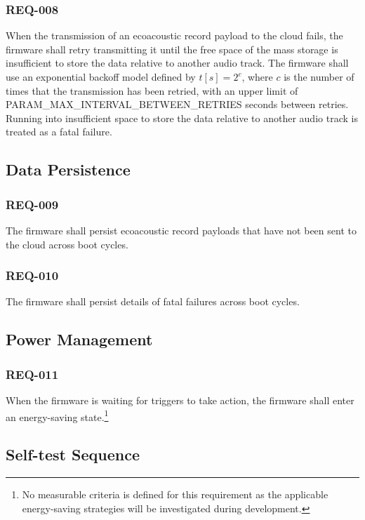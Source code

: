 \documentclass[11pt,a4paper]{article}
\begin{document}
\subsubsection{REQ-008}

When the transmission of an ecoacoustic record payload to the cloud fails, the
firmware shall retry transmitting it until the free space of the mass storage
is insufficient to store the data relative to another audio track. The firmware
shall use an exponential backoff model defined by $t[s]=2^c$, where $c$ is the
number of times that the transmission has been retried, with an upper limit of
PARAM\_MAX\_INTERVAL\_BETWEEN\_RETRIES seconds between retries. Running into
insufficient space to store the data relative to another audio track is treated
as a fatal failure.

\subsection{Data Persistence}

\subsubsection{REQ-009}

The firmware shall persist ecoacoustic record payloads that have not been sent
to the cloud across boot cycles.

\subsubsection{REQ-010}

The firmware shall persist details of fatal failures across boot cycles.

\subsection{Power Management}

\subsubsection{REQ-011}

When the firmware is waiting for triggers to take action, the firmware shall
enter an energy-saving state.\footnote{No measurable criteria is defined for
this requirement as the applicable energy-saving strategies will be investigated
during development.}

\subsection{Self-test Sequence}
\end{document}
